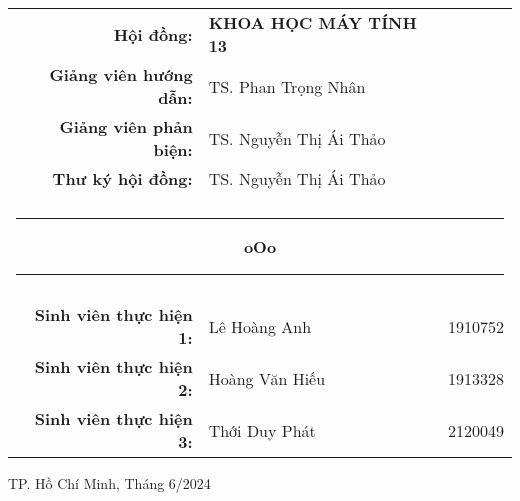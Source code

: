 \begin{titlepage}
    \begingroup
        \fontsize{14pt}{12pt}\selectfont
        \begin{center}
            \begin{tabular}{rll}
                \color{black} \textbf{Hội đồng:} & \color{black} \textbf{KHOA HỌC MÁY TÍNH 13} &  \\
                \color{black} \textbf{Giảng viên hướng dẫn:} & \color{black} TS. Phan Trọng Nhân &  \\
                \color{black} \textbf{Giảng viên phản biện:} & \color{black} TS. Nguyễn Thị Ái Thảo &  \\
                \color{black} \textbf{Thư ký hội đồng:} & \color{black} TS. Nguyễn Thị Ái Thảo &  \\
                \\

                \multicolumn{3}{c}{\noindent\rule{4cm}{0.5pt} \textbf{oOo} \noindent\rule{4cm}{0.5pt}} \\ \\
                \color{black}\textbf{Sinh viên thực hiện 1:} & \color{black}Lê Hoàng Anh & \color{black}1910752 \\
                \color{black}\textbf{Sinh viên thực hiện 2:} & \color{black}Hoàng Văn Hiếu & \color{black}1913328 \\
                \color{black}\textbf{Sinh viên thực hiện 3:} & \color{black}Thới Duy Phát & \color{black}2120049 \\
            \end{tabular}
        \end{center}
    \endgroup
    
    \vspace{1.5cm}

    \begingroup
        \fontsize{12pt}{12pt}\selectfont
        \begin{center}
            {TP. Hồ Chí Minh, Tháng 6/2024}
        \end{center}
    \endgroup
    
\end{titlepage}